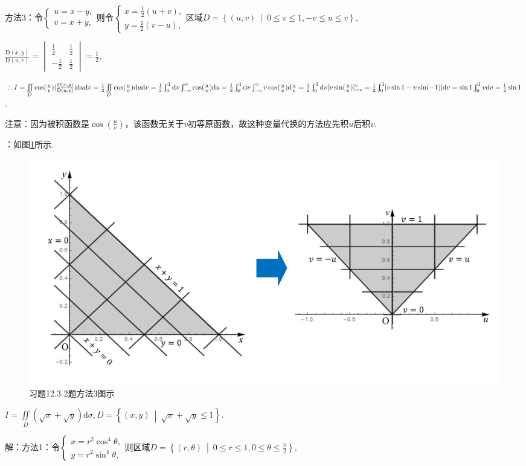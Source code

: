 \documentclass[12pt,UTF8]{ctexart}
\newcommand\Set[2]{\left\{#1\ \middle\vert\ #2 \right\}}
\newcommand{\Int}[4]{\varint\nolimits_{#1}^{#2}#3\mathrm d#4}
\newcommand{\IInt}[3]{\iint\limits_{#1}#2\mathrm d#3}
\newcommand{\varIInt}[4]{\iint\limits_{#1}#2\mathrm d#3\mathrm d#4}
\begin{document}
\begin{enumerate}
方法3：令$\begin{cases}
u=x-y,\\
v=x+y,
\end{cases}$则令$\begin{cases}
x=\frac12(u+v),\\
y=\frac12(v-u),
\end{cases}$区域$D=\Set{(u,v)}{0\leqslant v\leqslant1,-v\leqslant u\leqslant v}$,

$\frac{\mathrm D(x,y)}{\mathrm D(u,v)}=\begin{vmatrix}
\frac12&\frac12\\
-\frac12&\frac12
\end{vmatrix}=\frac12$,

$\therefore I=\varIInt D{\cos(\frac uv)|\frac{\mathrm D(x,y)}{\mathrm D(u,v)}|}uv=\frac12\varIInt D{\cos(\frac uv)}uv=\frac12\Int01{}v\Int{-v}v{\cos(\frac uv)}u=\frac12\Int01{}v\Int{-v}v{v\cos(\frac uv)}{\frac uv}\\
=\frac12\Int01{}v[v\sin(\frac uv)]_{-v}^v=\frac12\Int01{[v\sin1-v\sin(-1)]}v=\sin1\Int01vv=\frac12\sin1$.

注意：因为被积函数是$\cos(\frac uv)$，该函数无关于$v$初等原函数，故这种变量代换的方法应先积$u$后积$v$.

{}：如图\ref{12-3-2-3}所示.
\begin{figure}[H]
\begin{center}
\includegraphics[height=0.3\textheight]{Figures/Fig12-3-2-3.pdf}
\end{center}
\caption{习题12.3 2题方法3图示}
\label{12-3-2-3}
\end{figure}

$I=\IInt D{(\sqrt x+\sqrt y)}\sigma,D=\Set{(x,y)}{\sqrt x+\sqrt y\leqslant1}$.

解：方法1：令$\begin{cases}
x=r^2\cos^4\theta,\\
y=r^2\sin^4\theta,
\end{cases}$则区域$D=\Set{(r,\theta)}{0\leqslant r\leqslant1,0\leqslant\theta\leqslant\frac\pi2}$,


\end{enumerate}
\end{document}

